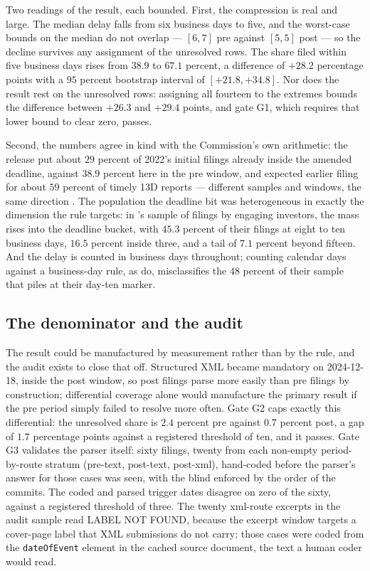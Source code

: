 \documentclass[11pt]{article}
\begin{document}
Two readings of the result, each bounded. First, the compression is real and large. The median
delay falls from six business days to five, and the worst-case bounds on the median do not
overlap --- $[6, 7]$ pre against $[5, 5]$ post --- so the decline survives any assignment of
the unresolved rows. The share
filed within five business days rises from $38.9$ to $67.1$ percent, a difference of $+28.2$
percentage points with a $95$ percent bootstrap interval of $[+21.8, +34.8]$. Nor does the
result rest on the unresolved rows: assigning all fourteen to the extremes bounds the difference
between $+26.3$ and $+29.4$ points, and gate G1, which requires that lower bound to clear zero,
passes.

Second, the numbers agree in kind with the Commission's own arithmetic: the release put about
$29$ percent of 2022's initial filings already inside the amended deadline, against $38.9$
percent here in the pre window, and expected earlier filing for about $59$ percent of timely 13D
reports --- different samples and windows, the same direction \citep{SEC2023}. The population
the deadline bit was heterogeneous in exactly the dimension the rule targets: in
\citet{BebchukBravJacksonJiang2013}'s sample of filings by engaging investors, the mass rises
into the deadline bucket, with $45.3$ percent of their filings at eight to ten business days,
$16.5$ percent inside three, and a tail of $7.1$ percent beyond fifteen. And the delay is
counted in business days throughout; counting calendar days against a business-day rule, as
\citet{PolkBuchheitRileyStone2024} do, misclassifies the $48$ percent of their sample that piles
at their day-ten marker.

\subsection{The denominator and the audit}
\label{sec:e1audit}

The result could be manufactured by measurement rather than by the rule, and the audit exists to
close that off. Structured XML became mandatory on 2024-12-18, inside the post window, so post
filings parse more easily than pre filings by construction; differential coverage alone would
manufacture the primary result if the pre period simply failed to resolve more often. Gate G2
caps exactly this differential: the unresolved share is $2.4$ percent pre against $0.7$ percent
post, a gap of $1.7$ percentage points against a registered threshold of ten, and it passes.
Gate G3 validates the parser itself: sixty filings, twenty from each non-empty period-by-route
stratum (pre-text, post-text, post-xml), hand-coded before the parser's answer for those cases
was seen, with the blind enforced by the order of the commits. The coded and parsed trigger
dates disagree on zero of the sixty, against a registered threshold of three. The twenty
xml-route excerpts in the audit sample read LABEL NOT FOUND, because the excerpt window targets
a cover-page label that XML submissions do not carry; those cases were coded from the
\texttt{dateOfEvent} element in the cached source document, the text a human coder would read.
\end{document}
